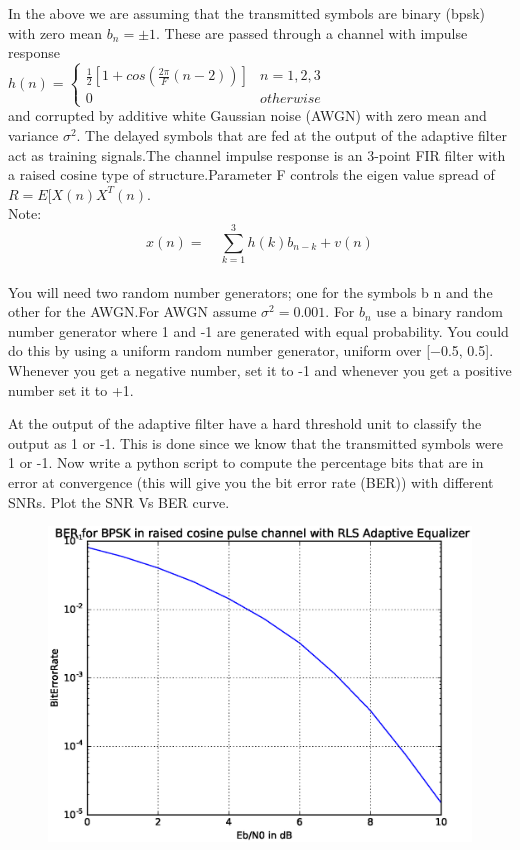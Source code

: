 \documentclass[journal,12pt,twocolumn]{IEEEtran}
\begin{document}
\bigskip
In the above we are assuming that the transmitted symbols are binary (bpsk) with zero mean $b_n=\pm 1$. These are passed through a channel with impulse response\\
\medskip
$h(n)=\begin{cases}
\frac{1}{2}[1+cos(\frac{2\pi}{F}{(n-2)})]& n=1,2,3\\
0 & otherwise
\end{cases}$\\
\medskip
and corrupted by additive white Gaussian noise (AWGN) with zero mean and variance $\sigma^2$. The delayed symbols that are fed at the output of the adaptive filter act as training signals.The channel impulse response is an 3-point FIR filter with a raised cosine type of structure.Parameter F controls the eigen value spread of $R=E[X(n)X^T(n)$.\\
\medskip
Note:\\ 
$$x(n)=\quad\sum_{k=1}^{3}h(k)b_{n-k}+v(n)$$\\
\medskip
You will need two random number generators; one for the symbols b n and the other for the AWGN.For AWGN assume $\sigma^2=0.001.$ For $b_n$ use a binary random number generator where 1 and -1 are generated with equal probability. You could do this by using a uniform random number generator, uniform over [−0.5, 0.5]. Whenever you get a negative number, set it to -1 and whenever you get a positive number set it to +1.
\medskip
\begin{problem}
At the output of the adaptive filter have a hard threshold unit to classify the output as 1 or -1. This is done since we know that the transmitted symbols were 1 or -1. Now write a python script to compute the percentage bits that are in error at convergence (this will give you the bit error rate (BER)) with different SNRs. Plot the SNR Vs BER curve.
\end{problem}
\solution
	  
\begin{center}
\begin{figure}
\centering
\includegraphics[width=\columnwidth]{SNR_BER.eps}
\caption{}
\label{fig:f3}
\end{figure}
\end{center}
\end{document}
